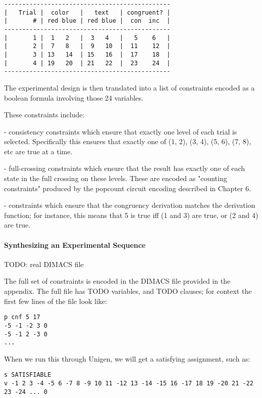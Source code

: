 \begin{verbatim}
----------------------------------------------
|   Trial |  color   |   text   | congruent? |
|       # | red blue | red blue |  con  inc  |
----------------------------------------------
|       1 |  1   2   |  3   4   |   5    6   |
|       2 |  7   8   |  9   10  |  11    12  |
|       3 | 13   14  | 15   16  |  17    18  |
|       4 | 19   20  | 21   22  |  23    24  |
----------------------------------------------
\end{verbatim}

The experimental design is then translated into a list of constraints encoded as a boolean formula involving those 24 variables.

These constraints include:

- consistency constraints which ensure that exactly one level of each trial is selected. Specifically this ensures that exactly one of (1, 2), (3, 4), (5, 6), (7, 8), etc are true at a time.

- full-crossing constraints which ensure that the result has exactly one of each state in the full crossing on these levels. These are encoded as "counting constraints" produced by the popcount circuit encoding described in Chapter 6.

- constraints which ensure that the congruency derivation matches the derivation function; for instance, this means that 5 is true iff (1 and 3) are true, or (2 and 4) are true.

\paragraph*{Synthesizing an Experimental Sequence}

TODO: real DIMACS file

The full set of constraints is encoded in the DIMACS file provided in the appendix. The full file has TODO variables, and TODO clauses; for context the first few lines of the file look like:

\begin{verbatim}
p cnf 5 17
-5 -1 -2 3 0
-5 -1 2 -3 0
...
\end{verbatim}

When we run this through Unigen, we will get a satisfying assignment, such as:

\begin{verbatim}
s SATISFIABLE
v -1 2 3 -4 -5 6 -7 8 -9 10 11 -12 13 -14 -15 16 -17 18 19 -20 21 -22 23 -24 ... 0
\end{verbatim}


